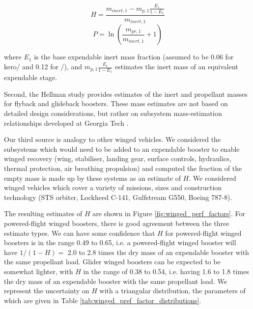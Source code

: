 \documentclass[conf]{../new-aiaa}
\begin{document}
\[
H = \frac{m_{inert,1} - m_{p,1} \frac{E_1}{1 - E_1}}{m_{inert,1}}
\]
\[
P = \ln\left( \frac{m_{pr,1}}{m_{inert,1}} + 1 \right)
\]

where $E_1$ is the base expendable inert mass fraction (assumed to be 0.06 for kero/ and 0.12 for /), and $m_{p,1} \frac{E_1}{1 - E_1}$ estimates the inert mass of an equivalent expendable stage.

Second, the Hellman study provides estimates of the inert and propellant masses for flyback and glideback boosters. These mass estimates are not based on detailed design considerations, but rather on subsystem mass-estimation relationships developed at Georgia Tech \cite{Rohrschneider2002}.

Our third source is analogy to other winged vehicles. We considered the subsystems which would need to be added to an expendable booster to enable winged recovery (wing, stabiliser, landing gear, surface controls, hydraulics, thermal protection, air breathing propulsion) and computed the fraction of the empty mass is made up by these systems as an estimate of $H$. We considered winged vehicles which cover a variety of missions, sizes and construction technology (STS orbiter, Lockheed C-141, Gulfstream G550, Boeing 787-8).

The resulting estimates of $H$ are shown in Figure \ref{fig:winged_perf_factors}. For powered-flight winged boosters, there is good agreement between the three estimate types. We can have some confidence that $H$ for powered-flight winged boosters is in the range 0.49 to 0.65, i.e. a powered-flight winged booster will have $1/(1-H) =$ 2.0 to 2.8 times the dry mass of an expendable booster with the same propellant load. Glider winged boosters can be expected to be somewhat lighter, with $H$ in the range of 0.38 to 0.54, i.e. having 1.6 to 1.8 times the dry mass of an expendable booster with the same propellant load. We represent the uncertainty on $H$ with a triangular distribution, the parameters of which are given in Table \ref{tab:winged_pref_factor_distributions}.
\end{document}

